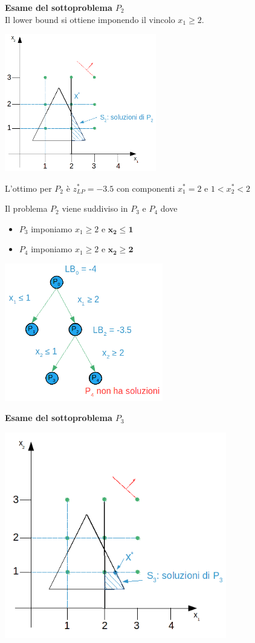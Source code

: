 \textbf{Esame del sottoproblema $P_{2}$}\\
Il lower bound si ottiene imponendo il vincolo $x_{1}\ge 2$.

\centerline{\includegraphics[height=6cm]{images/graph21.png}}
L'ottimo per $P_{2}$ è $z_{LP}^{*}=-3.5$ con componenti $x_{1}^{*}=2$ e $1<x_{2}^{*}<2$

Il problema $P_{2}$ viene suddiviso in $P_{3}$ e $P_{4}$ dove
\begin{itemize}
	\item $P_{3}$ imponiamo $x_{1}\ge 2$ e \underline{$\boldsymbol{x_{2}\le 1}$}
	\item $P_{4}$ imponiamo $x_{1}\ge 2$ e \underline{$\boldsymbol{x_{2}\ge 2}$}
\end{itemize}

\centerline{\includegraphics[height=6cm]{images/graph22.png}}

\textbf{Esame del sottoproblema $P_{3}$}

\centerline{\includegraphics[height=9cm]{images/graph23.png}}

